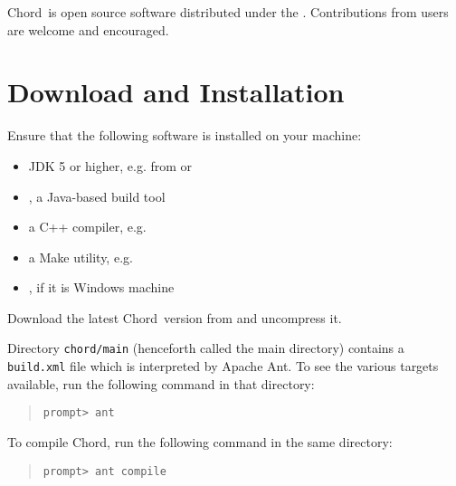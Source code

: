 \documentclass{article}
\providecommand\Chord{Chord}
\begin{document}
\Chord\ is open source software distributed under the .
Contributions from users are welcome and encouraged.

\texonly{\newpage}
\section{Download and Installation}

Ensure that the following software is installed on your machine:

\begin{itemize}
\item
JDK 5 or higher, e.g. from  or 
\item
{}, a Java-based build tool
\item
a C++ compiler, e.g. 
\item
a Make utility, e.g. 
\item
{}, if it is Windows machine
\end{itemize}

Download the latest \Chord\ version from  and uncompress it.

Directory {\tt chord/main} (henceforth called the main directory) contains a {\tt build.xml} file which is interpreted by Apache Ant.
To see the various targets available, run the following command in that directory:

\begin{quote}
\begin{verbatim}
prompt> ant
\end{verbatim}
\end{quote}

To compile \Chord, run the following command in the same directory:

\begin{quote}
\begin{verbatim}
prompt> ant compile
\end{verbatim}
\end{quote}
\end{document}
